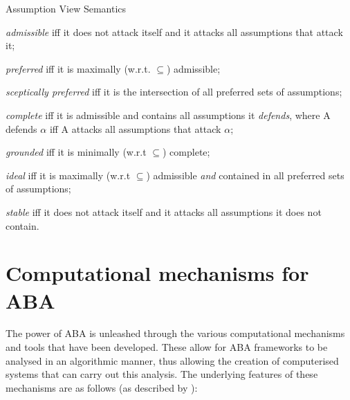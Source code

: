 Assumption View Semantics
\begin{itemize*}
\item \emph{admissible} iff it does not attack itself and it attacks all assumptions that attack it;
\item \emph{preferred} iff it is maximally (w.r.t. $\subseteq$) admissible;
\item \emph{sceptically preferred} iff it is the intersection of all preferred sets of assumptions;
\item \emph{complete} iff it is admissible and contains all assumptions it \emph{defends}, where A defends $\alpha$ iff A attacks all assumptions that attack $\alpha$;
\item \emph{grounded} iff it is minimally (w.r.t $\subseteq$) complete;
\item \emph{ideal} iff it is maximally (w.r.t $\subseteq$) admissible \emph{and} contained in all preferred sets of assumptions;
\item \emph{stable} iff it does not attack itself and it attacks all assumptions it does not contain.
\end{itemize*}

\section{Computational mechanisms for ABA}
The power of ABA is unleashed through the various computational mechanisms and tools that have been developed. These allow for ABA frameworks to be analysed in an algorithmic manner, thus allowing the creation of computerised systems that can carry out this analysis. The underlying features of these mechanisms are as follows (as described by \cite{abatut}):
\newline

